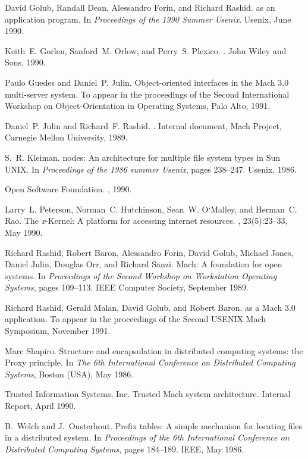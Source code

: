 %
%

\begin{thebibliography}{10}

David Golub, Randall Dean, Alessandro Forin, and Richard Rashid.
 as an application program.
\newblock In {\em Proceedings of the 1990 Summer Usenix}. Usenix, June 1990.

Keith~E. Gorlen, Sanford~M. Orlow, and Perry~S. Plexico.
.
\newblock John Wiley and Sons, 1990.

Paulo Guedes and Daniel~P. Julin.
\newblock Object-oriented interfaces in the {Mach 3.0} multi-server system.
\newblock To appear in the proceedings of the Second International Workshop on
  Object-Orientation in Operating Systems, Palo Alto, 1991.

Daniel~P. Julin and Richard~F. Rashid.
.
\newblock Internal document, Mach Project, Carnegie Mellon University, 1989.

S.~R. Kleiman.
nodes: An architecture for multiple file system types in {S}un
  {UNIX}.
\newblock In {\em Proceedings of the 1986 summer Usenix}, pages 238--247.
  Usenix, 1986.

Open Software Foundation.
, 1990.

Larry~L. Peterson, Norman~C. Hutchinson, Sean~W. O`Malley, and Herman~C. Rao.
\newblock The {\it x}-{K}ernel: A platform for accessing internet resources.
, 23(5):23--33, May 1990.

Richard Rashid, Robert Baron, Alessandro Forin, David Golub, Michael Jones,
  Daniel Julin, Douglas Orr, and Richard Sanzi.
\newblock Mach: A foundation for open systems.
\newblock In {\em Proceedings of the Second Workshop on Workstation Operating
  Systems}, pages 109--113. IEEE Computer Society, September 1989.

Richard Rashid, Gerald Malan, David Golub, and Robert Baron.
 as a {Mach 3.0} application.
\newblock To appear in the proceedings of the Second USENIX Mach Symposium,
  November 1991.

Marc Shapiro.
\newblock Structure and encapsulation in distributed computing systems: the
  {P}roxy principle.
\newblock In {\em The 6th International Conference on Distributed Computing
  Systems}, Boston ({USA}), May 1986.

{Trusted Information Systems, Inc.}
\newblock Trusted {M}ach system architecture.
\newblock Internal Report, April 1990.

B.~Welch and J.~Ousterhout.
\newblock Prefix tables: A simple mechanism for locating files in a distributed
  system.
\newblock In {\em Proceedings of the 6th International Conference on
  Distributed Computing Systems}, pages 184--189. IEEE, May 1986.

\end{thebibliography}


